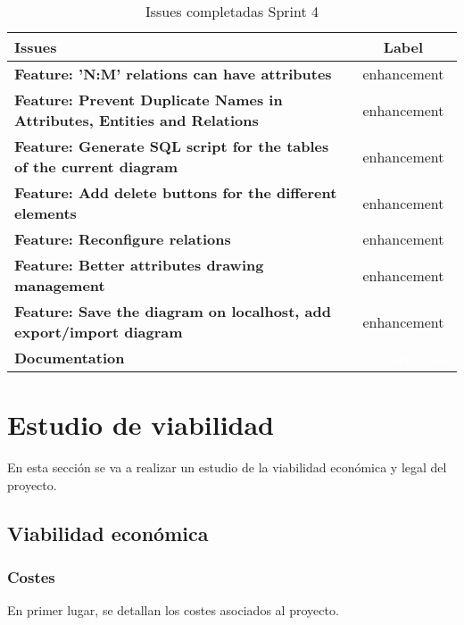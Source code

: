 \begin{table}[ht!]
    \centering
    \resizebox{14cm}{!} {
    \begin{tabular}{|l|c|}
    \hline
    \rowcolor[rgb]{0.9, 0.9, 0.9}
    \textbf{Issues} & \textbf{Label} \\ \hline
    \textbf{Feature: 'N:M' relations can have attributes} & \cellcolor[rgb]{0.64, 0.93, 0.94}enhancement \\ \hline 
    \textbf{Feature: Prevent Duplicate Names in Attributes, Entities and Relations} & \cellcolor[rgb]{0.64, 0.93, 0.94}enhancement \\ \hline 
    \textbf{Feature: Generate SQL script for the tables of the current diagram} & \cellcolor[rgb]{0.64, 0.93, 0.94}enhancement \\ \hline 
    \textbf{Feature: Add delete buttons for the different elements} & \cellcolor[rgb]{0.64, 0.93, 0.94}enhancement \\ \hline 
    \textbf{Feature: Reconfigure relations} & \cellcolor[rgb]{0.64, 0.93, 0.94}enhancement \\ \hline
    \textbf{Feature: Better attributes drawing management} & \cellcolor[rgb]{0.64, 0.93, 0.94}enhancement \\ \hline
    \textbf{Feature: Save the diagram on localhost, add export/import diagram} & \cellcolor[rgb]{0.64, 0.93, 0.94}enhancement \\ \hline
    \textbf{Documentation} & \cellcolor[rgb]{0.0, 0.46, 0.79}\textcolor{white}{documentation} \\ \hline
    \end{tabular}}
    \caption{Issues completadas Sprint 4}
\end{table}

\newpage
\section{Estudio de viabilidad}
En esta sección se va a realizar un estudio de la viabilidad económica y legal del proyecto.

\subsection{Viabilidad económica}

\subsubsection{Costes}
En primer lugar, se detallan los costes asociados al proyecto.

